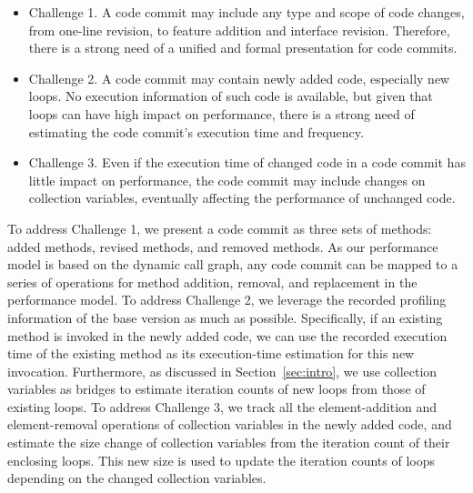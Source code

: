 \begin{itemize}

\item Challenge 1. A code commit may include any type and scope of code changes, from one-line revision, to feature addition and interface revision. Therefore, there is a strong need of a unified and formal presentation for code commits.  

\item Challenge 2. A code commit may contain newly added code, especially new loops. No execution information of such code is available, but given that loops can have high impact on performance, there is a strong need of estimating the code commit's execution time and frequency.
 
\item Challenge 3. Even if the execution time of changed code in a code commit has little impact on performance, the code commit may include changes on collection variables, eventually affecting the performance of unchanged code. 


\end{itemize}

To address Challenge 1, we present a code commit as three sets of methods: added methods, revised methods, and removed methods. As our performance model is based on the dynamic call graph, any code commit can be mapped to a series of operations for method addition, removal, and replacement in the performance model. To address Challenge 2, we leverage the recorded profiling information of the base version as much as possible. Specifically, if an existing method is invoked in the newly added code, we can use the recorded execution time of the existing method as its execution-time estimation for this new invocation. Furthermore, as discussed in Section~\ref{sec:intro}, we use collection variables as bridges to estimate iteration counts of new loops from those of existing loops. To address Challenge 3, we track all the element-addition and element-removal operations of collection variables in the newly added code, and estimate the size change of collection variables from the iteration count of their enclosing loops. This new size is used to update the iteration counts of loops depending on the changed collection variables. 




